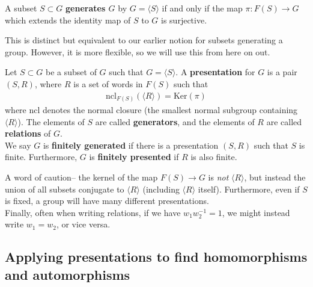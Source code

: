 \documentclass{memoir}
\begin{document}
\begin{defn}
	A subset \(S\subset G\) \textbf{generates \(G\)} by \(G = \langle S \rangle \) if and only if the map \(\pi :F(S) \to G\) which extends the identity map of \(S\) to \(G\) is surjective.
\end{defn}
This is distinct but equivalent to our earlier notion for subsets generating a group. However, it is more flexible, so we will use this from here on out.

\begin{defn}
	Let \(S\subset G\) be a subset of \(G\) such that \(G = \langle S \rangle \). A \textbf{presentation} for \(G\) is a pair \((S,R)\), where \(R\) is a set of words in \(F(S)\) such that
	\begin{align*}
		\textrm{ncl}_{F(S)}(\langle R \rangle ) = \textrm{Ker}(\pi )
	\end{align*}
	where \(\textrm{ncl}\) denotes the normal closure (the smallest normal subgroup containing \(\langle R \rangle \)). The elements of \(S\) are called \textbf{generators}, and the elements of \(R\) are called \textbf{relations} of \(G\).\\

	We say \(G\) is \textbf{finitely generated} if there is a presentation \((S,R)\) such that \(S\) is finite. Furthermore, \(G\) is \textbf{finitely presented} if \(R\) is also finite.
\end{defn}
A word of caution-- the kernel of the map \(F(S) \to G\) is \textit{not} \(\langle R \rangle \), but instead the union of all subsets conjugate to \(\langle R \rangle \) (including \(\langle R \rangle \) itself). Furthermore, even if \(S\) is fixed, a group will have many different presentations.\\

Finally, often when writing relations, if we have \(w_1w_2^{-1} = 1\), we might instead write \(w_1=w_2\), or vice versa.

\subsection{Applying presentations to find homomorphisms and automorphisms}
\label{sub:applying_presentations_to_find_homomorphisms_and_automorphisms}
\end{document}
